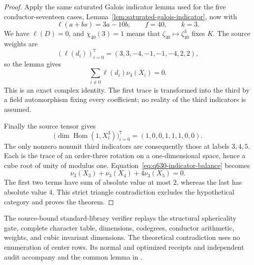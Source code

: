 \begin{proof}
Apply the same saturated Galois indicator lemma used for the five
conductor-seventeen cases, Lemma~\ref{lem:saturated-galois-indicator},
now with
\[
\ell(a+bs)=3a-10b,\qquad f=40,\qquad k=3.
\]
We have $\ell(D)=0$, and $\chi_{40}(3)=1$ means that
$\zeta_{40}\mapsto\zeta_{40}^3$ fixes $K$. The source weights are
\[
(\ell(d_i))_{i=0}^7=(3,3,-4,-1,-1,-4,2,2),
\]
so the lemma gives
\begin{equation}\label{eq:q630-indicator-balance}
\sum_{i\ne0}\ell(d_i)\nu_3(X_i)=0.
\end{equation}
This is an exact complex identity. The first trace is transformed
into the third by a field automorphism fixing every coefficient;
no reality of the third indicators is assumed.

Finally the source tensor gives
\[
\bigl(\dim\operatorname{Hom}(1,X_i^3)\bigr)_{i=0}^7
 =(1,0,0,1,1,1,0,0).
\]
The only nonzero nonunit third indicators are consequently those
at labels $3,4,5$. Each is the trace of an order-three rotation on
a one-dimensional space, hence a cube root of unity of modulus one.
Equation~\eqref{eq:q630-indicator-balance} becomes
\[
\nu_3(X_3)+\nu_3(X_4)+4\nu_3(X_5)=0.
\]
The first two terms have sum of absolute value at most $2$, whereas
the last has absolute value $4$. This strict triangle contradiction
excludes the hypothetical category and proves the theorem.
\end{proof}

The source-bound standard-library verifier
 replays the structural
sphericality gate, complete character table, dimensions, codegrees,
conductor arithmetic, weights, and cubic invariant dimensions.
The theoretical contradiction uses no enumeration of center rows.
Its normal and optimized receipts and independent audit accompany
 and the common lemma
 in
.
